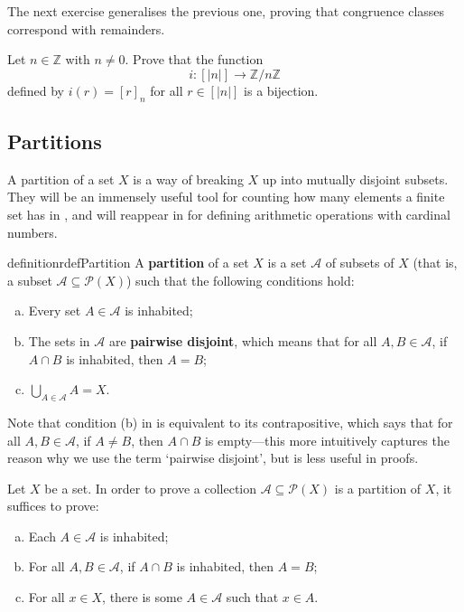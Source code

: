 The next exercise generalises the previous one, proving that congruence classes correspond with remainders.

\begin{exercise}
\label{exCongruenceClassesCorrespondWithRemainders}
Let $n \in \mathbb{Z}$ with $n \ne 0$. Prove that the function
\[ i : [|n|] \to \mathbb{Z}/n\mathbb{Z} \]
defined by $i(r) = [r]_n$ for all $r \in [|n|]$ is a bijection.
\end{exercise}

\subsection*{Partitions}

A partition of a set $X$ is a way of breaking $X$ up into mutually disjoint subsets. They will be an immensely useful tool for counting how many elements a finite set has in , and will reappear in  for defining arithmetic operations with cardinal numbers.

\begin{restatable}{definition}{rdefPartition}
\label{defPartition}
A \textbf{partition} of a set $X$ is a set $\mathcal{A}$ of subsets of $X$ (that is, a subset $\mathcal{A} \subseteq \mathcal{P}(X)$) such that the following conditions hold:
\begin{enumerate}[(a)]
\item Every set $A \in \mathcal{A}$ is inhabited;
\item The sets in $\mathcal{A}$ are \textbf{pairwise disjoint}, which means that for all $A,B \in \mathcal{A}$, if $A \cap B$ is inhabited, then $A=B$;
\item $\displaystyle \bigcup_{A \in \mathcal{A}} A = X$.
\end{enumerate}
\end{restatable}

Note that condition (b) in  is equivalent to its contrapositive, which says that for all $A,B \in \mathcal{A}$, if $A \ne B$, then $A \cap B$ is empty---this more intuitively captures the reason why we use the term `pairwise disjoint', but is less useful in proofs.

\begin{strategy}
\label{strProvingSubsetsFormPartition}
Let $X$ be a set. In order to prove a collection $\mathcal{A} \subseteq \mathcal{P}(X)$ is a partition of $X$, it suffices to prove:
\begin{enumerate}[(a)]
\item Each $A \in \mathcal{A}$ is inhabited;
\item For all $A,B \in \mathcal{A}$, if $A \cap B$ is inhabited, then $A=B$;
\item For all $x \in X$, there is some $A \in \mathcal{A}$ such that $x \in A$.
\end{enumerate}
\end{strategy}

